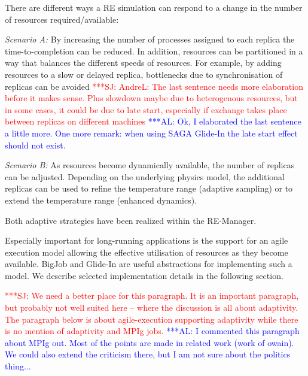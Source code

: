 \documentclass{rspublic}
\newcommand{\alnote}[1]{ {\textcolor{blue} { ***AL: #1 }}}
\newcommand{\jhanote}[1]{ {\textcolor{red} { ***SJ: #1 }}}
\newcommand{\alnote}[1]{}
\newcommand{\jhanote}[1]{}
\begin{document}
There are different ways
a RE simulation can respond to a change in the number of resources
required/available:
\begin{compactitem}         
\item {\it Scenario A:} By increasing the number of processes assigned
  to each replica the time-to-completion can be reduced. In addition,
  resources can be partitioned in a way that balances the different
  speeds of resources.  For example, by adding resources to a slow or
  delayed replica, bottlenecks due to synchronisation of replicas can
  be avoided
  \jhanote{AndreL: The last sentence needs more elaboration before it
    makes sense. Plus slowdown maybe due to heterogenous resources,
    but in some cases, it could be due to late start, especially if
    exchange takes place between replicas on different machines}
  \alnote{Ok, I elaborated the last sentence a little more. One more
    remark: when using SAGA Glide-In the late start effect should not
    exist.}

\item {\it Scenario B:} As resources become dynamically available, the
  number of replicas can be adjusted. Depending on the underlying
  physics model, the additional replicas can be used to refine the
  temperature range (adaptive sampling) or to extend the temperature
  range (enhanced dynamics).
\end{compactitem}           
Both adaptive strategies have been realized within the RE-Manager.

Especially important for long-running applications is the support for
an agile execution model allowing the effective utilisation of
resources as they become available. BigJob and Glide-In are useful
abstractions for implementing such a model.  We describe selected
implementation details in the following section.


\jhanote{We need a better place for this paragraph. It is an important
  paragraph, but probably not well suited here -- where the discussion
  is all about adaptivity. The paragraph below is about
  agile-execution supporting adaptivity while there is no mention of
  adaptivity and MPIg jobs.}
\alnote{I commented this paragraph about MPIg out. Most of the points are
made in related work (work of owain). We could also extend the criticism
there, but I am not sure about the politics thing...}  
\end{document}
